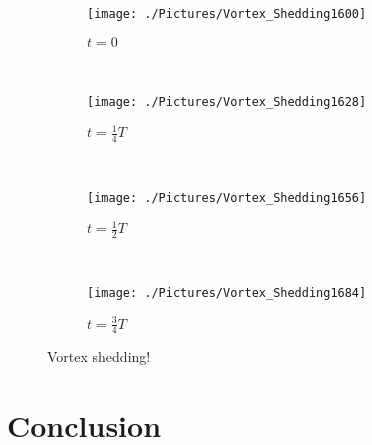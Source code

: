 \documentclass[10pt, titlepage]{article}
\begin{document}
\lipsum[1-2]

\begin{figure}
\begin{subfigure}{\linewidth}
  \centering
  \texttt{[image: ./Pictures/Vortex\_Shedding1600]}
  \caption{$t = 0$}
\end{subfigure} \\
\begin{subfigure}{\textwidth}
  \centering
  \texttt{[image: ./Pictures/Vortex\_Shedding1628]}
  \caption{$t = \frac{1}{4}T$}
\end{subfigure} \\
\begin{subfigure}{\linewidth}
  \centering
  \texttt{[image: ./Pictures/Vortex\_Shedding1656]}
  \caption{$t = \frac{1}{2}T$}
\end{subfigure} \\
\begin{subfigure}{\textwidth}
  \centering
  \texttt{[image: ./Pictures/Vortex\_Shedding1684]}
  \caption{$t = \frac{3}{4}T$}
\end{subfigure}
\caption[Vortex Shedding at $\frac{1}{4}T$ increments]{Vortex shedding!}
\label{fig:vortexstill}
\end{figure}

\section{Conclusion}

\lipsum[5-7]
\end{document}
